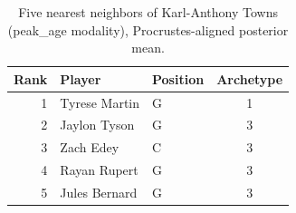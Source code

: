 \begin{table}[htbp]
  \centering\small
  \begin{tabular}{rllc}
    \toprule
    Rank & Player & Position & Archetype \\
    \midrule
    1 & Tyrese Martin & G & 1 \\
    2 & Jaylon Tyson & G & 3 \\
    3 & Zach Edey & C & 3 \\
    4 & Rayan Rupert & G & 3 \\
    5 & Jules Bernard & G & 3 \\
    \bottomrule
  \end{tabular}
  \caption{Five nearest neighbors of Karl-Anthony Towns (peak_age modality), Procrustes-aligned posterior mean.}
  \label{tab:Karl_Anthony_Towns_neighbors_peak_age}
\end{table}

